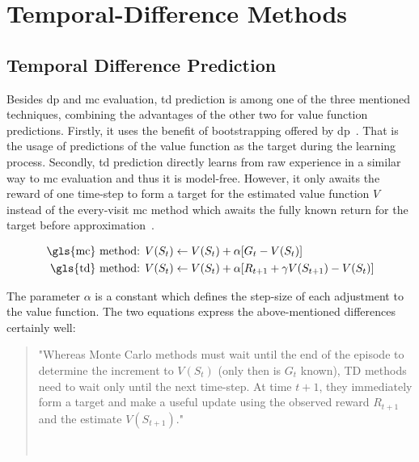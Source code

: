 \documentclass[draft,final]{vutinfth} %
\newcommand{\p}[1]{see p. #1}
\begin{document}
    \section{Temporal-Difference Methods}


    \subsection{Temporal Difference Prediction}
    Besides \gls{dp} and \gls{mc} evaluation, \gls{td} prediction is among one of the three mentioned techniques, combining the advantages of the other two for value function predictions.
    Firstly, it uses the benefit of bootstrapping offered by \gls{dp}~\citep[\p{18}]{szepesvari_algorithms_2010}.
    That is the usage of predictions of the value function as the target during the learning process.
    Secondly, \gls{td} prediction directly learns from raw experience in a similar way to \gls{mc} evaluation and thus it is model-free.
    However, it only awaits the reward of one time-step to form a target for the estimated value function $V$ instead of the every-visit \gls{mc} method which awaits the fully known return for the target before approximation~\citep[\p{120}]{sutton_reinforcement_2018}.

    \begin{equation}
        \begin{aligned}[t]
            \text{\gls{mc} method: } & V(S_t) \leftarrow V(S_t) + \alpha [G_t - V(S_t)]\\
            \text{\gls{td} method: } & V(S_t) \leftarrow V(S_t) + \alpha [R_{t+1} + \gamma V(S_{t+1})-V(S_t)]\\
        \end{aligned}\label{eq:td_versus_mc}
    \end{equation}

    The parameter $\alpha$ is a constant which defines the step-size of each adjustment to the value function.
    The two equations express the above-mentioned differences certainly well:

    \begin{quote}
        "Whereas Monte Carlo methods must wait until the end of the episode to determine the increment to $V(S_t)$ (only then is $G_t$ known), TD methods need to wait only until the next time-step.
        At time $t + 1$, they immediately form a target and make a useful update using the observed reward $R_{t+1}$ and the estimate $V(S_{t+1})$."

        \hfill~\cite[\p{120}]{sutton_reinforcement_2018}
    \end{quote}
\end{document}
